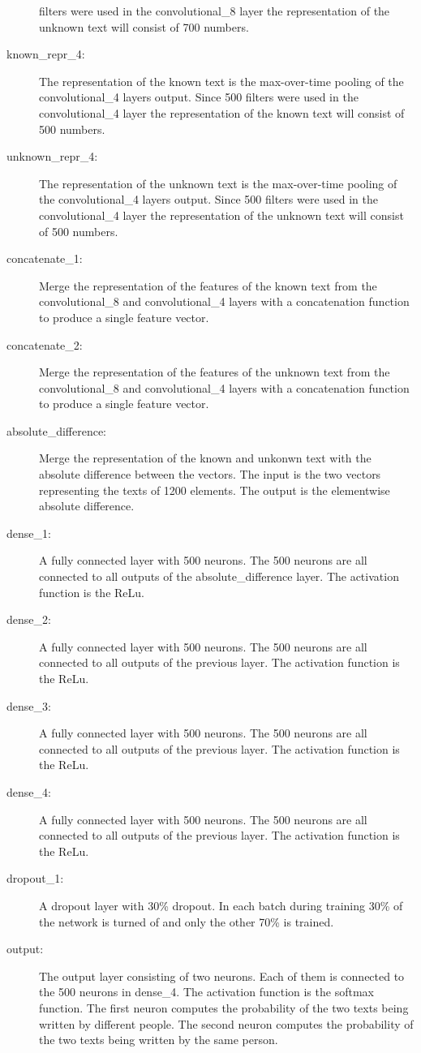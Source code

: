 \begin{description}
        filters were used in the convolutional\_8 layer the representation of
        the unknown text will consist of 700 numbers.
    \item[known\_repr\_4:] The representation of the known text is the
        max-over-time pooling of the convolutional\_4 layers output. Since 500
        filters were used in the convolutional\_4 layer the representation of
        the known text will consist of 500 numbers.
    \item[unknown\_repr\_4:] The representation of the unknown text is the
        max-over-time pooling of the convolutional\_4 layers output. Since 500
        filters were used in the convolutional\_4 layer the representation of
        the unknown text will consist of 500 numbers.
    \item[concatenate\_1:] Merge the representation of the features of the known
        text from the convolutional\_8 and convolutional\_4 layers with a
        concatenation function to produce a single feature vector.
    \item[concatenate\_2:] Merge the representation of the features of the
        unknown text from the convolutional\_8 and convolutional\_4 layers with
        a concatenation function to produce a single feature vector.
    \item[absolute\_difference:] Merge the representation of the known and
        unkonwn text with the absolute difference between the vectors. The input
        is the two vectors representing the texts of 1200 elements. The output
        is the elementwise absolute difference.
    \item[dense\_1:] A fully connected layer with 500 neurons. The 500 neurons
        are all connected to all outputs of the absolute\_difference layer. The
        activation function is the \gls{ReLu}.
    \item[dense\_2:] A fully connected layer with 500 neurons. The 500 neurons
        are all connected to all outputs of the previous layer. The
        activation function is the \gls{ReLu}.
    \item[dense\_3:] A fully connected layer with 500 neurons. The 500 neurons
        are all connected to all outputs of the previous layer. The
        activation function is the \gls{ReLu}.
    \item[dense\_4:] A fully connected layer with 500 neurons. The 500 neurons
        are all connected to all outputs of the previous layer. The
        activation function is the \gls{ReLu}.
    \item[dropout\_1:] A dropout layer with 30\% dropout. In each batch during
        training 30\% of the network is turned of and only the other 70\% is
        trained.
    \item[output:] The output layer consisting of two neurons. Each of them is
        connected to the 500 neurons in dense\_4. The activation function is the
        softmax function. The first neuron computes the probability of the two
        texts being written by different people. The second neuron computes the
        probability of the two texts being written by the same person.
\end{description}

